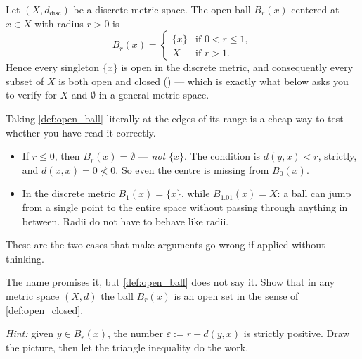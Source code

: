 \begin{aiexample}
Let $(X, d_{\text{disc}})$ be a discrete metric space. The open ball $B_r(x)$ centered at
$x \in X$ with radius $r > 0$ is
\[
B_r(x) = \begin{cases} \{x\} & \text{if } 0 < r \leq 1, \\ X & \text{if } r > 1. \end{cases}
\]
Hence every singleton $\{x\}$ is open in the discrete metric, and consequently every subset of
$X$ is both open and closed () --- which is exactly what
 below asks you to verify for $X$ and $\emptyset$ in a general metric
space.
\end{aiexample}

\begin{remark}
Taking \cref{def:open_ball} literally at the edges of its range is a cheap way to test whether
you have read it correctly.
\begin{itemize}
  \item If $r \leq 0$, then $B_r(x) = \emptyset$ --- \emph{not} $\{x\}$. The condition is
    $d(y,x) < r$, strictly, and $d(x,x) = 0 \not< 0$. So even the centre is missing from
    $B_0(x)$.
  \item In the discrete metric $B_1(x) = \{x\}$, while $B_{1.01}(x) = X$: a ball can jump from a
    single point to the entire space without passing through anything in between. Radii do not
    have to behave like radii.
\end{itemize}
These are the two cases that make  arguments go wrong if applied
without thinking.
\end{remark}

\begin{aiexercise}
\label{ex:ai_open_balls_are_open}
The name promises it, but \cref{def:open_ball} does not say it. Show that in any metric space
$(X,d)$ the ball $B_r(x)$ is an open set in the sense of \cref{def:open_closed}.

\textit{Hint:} given $y \in B_r(x)$, the number $\varepsilon := r - d(y,x)$ is strictly positive.
Draw the picture, then let the triangle inequality do the work.
\end{aiexercise}

